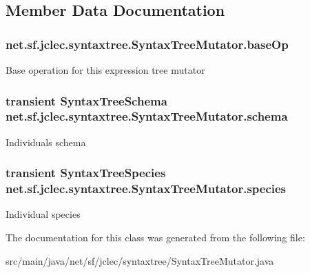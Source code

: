 \subsection{Member Data Documentation}
\hypertarget{classnet_1_1sf_1_1jclec_1_1syntaxtree_1_1_syntax_tree_mutator_ac59303a86fe2da4c9bf5667605092ae4}{
\subsubsection[{base\-Op}]{ net.\-sf.\-jclec.\-syntaxtree.\-Syntax\-Tree\-Mutator.\-base\-Op\hspace{0.3cm}{\ttfamily [protected]}}}\label{classnet_1_1sf_1_1jclec_1_1syntaxtree_1_1_syntax_tree_mutator_ac59303a86fe2da4c9bf5667605092ae4}
Base operation for this expression tree mutator \hypertarget{classnet_1_1sf_1_1jclec_1_1syntaxtree_1_1_syntax_tree_mutator_a9a656f8a48a9a41c394580d7c63a1f2b}{
\subsubsection[{schema}]{\setlength{\rightskip}{0pt plus 5cm}transient {\bf Syntax\-Tree\-Schema} net.\-sf.\-jclec.\-syntaxtree.\-Syntax\-Tree\-Mutator.\-schema\hspace{0.3cm}{\ttfamily [protected]}}}\label{classnet_1_1sf_1_1jclec_1_1syntaxtree_1_1_syntax_tree_mutator_a9a656f8a48a9a41c394580d7c63a1f2b}
Individuals schema \hypertarget{classnet_1_1sf_1_1jclec_1_1syntaxtree_1_1_syntax_tree_mutator_a5287fd6f2b16ef44218136210e1921f9}{
\subsubsection[{species}]{\setlength{\rightskip}{0pt plus 5cm}transient {\bf Syntax\-Tree\-Species} net.\-sf.\-jclec.\-syntaxtree.\-Syntax\-Tree\-Mutator.\-species\hspace{0.3cm}{\ttfamily [protected]}}}\label{classnet_1_1sf_1_1jclec_1_1syntaxtree_1_1_syntax_tree_mutator_a5287fd6f2b16ef44218136210e1921f9}
Individual species 

The documentation for this class was generated from the following file\-:\begin{DoxyCompactItemize}
\item 
src/main/java/net/sf/jclec/syntaxtree/Syntax\-Tree\-Mutator.\-java\end{DoxyCompactItemize}
